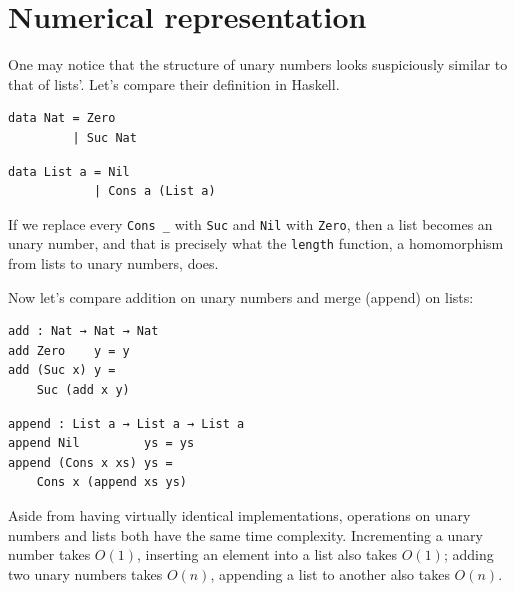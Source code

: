 \documentclass[../thesis.tex]{subfiles}
\begin{document}
\section{Numerical representation}

One may notice that the structure of unary numbers looks suspiciously similar
to that of lists'. Let's compare their definition in Haskell.

\noindent\begin{minipage}{.45\textwidth}
\begin{lstlisting}
data Nat = Zero
         | Suc Nat
\end{lstlisting}
\end{minipage}\hfill
\begin{minipage}{.48\textwidth}
\begin{lstlisting}
data List a = Nil
            | Cons a (List a)
\end{lstlisting}
\end{minipage}

If we replace every {\lstinline|Cons _|} with {\lstinline|Suc|} and {\lstinline|Nil|}
with {\lstinline|Zero|}, then a list becomes an unary number,
and that is precisely what the {\lstinline|length|} function,
a homomorphism from lists to unary numbers, does.

Now let's compare addition on unary numbers and merge (append) on lists:

\noindent\begin{minipage}{.48\textwidth}
\begin{lstlisting}[basicstyle=\ttfamily\scriptsize]
add : Nat → Nat → Nat
add Zero    y = y
add (Suc x) y =
    Suc (add x y)
\end{lstlisting}
\end{minipage}\hfill
\begin{minipage}{.45\textwidth}
\begin{lstlisting}[basicstyle=\ttfamily\scriptsize]
append : List a → List a → List a
append Nil         ys = ys
append (Cons x xs) ys =
    Cons x (append xs ys)
\end{lstlisting}
\end{minipage}

Aside from having virtually identical implementations, operations on unary numbers
and lists both have the same time complexity. Incrementing a unary number takes
$ O(1) $, inserting an element into a list also takes $ O(1) $; adding two unary
numbers takes $ O(n) $, appending a list to another also takes $ O(n) $.
\end{document}
